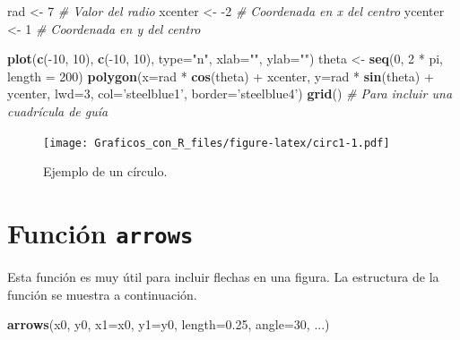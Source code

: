 \documentclass[10pt,]{krantz}
\makeatletter
\newenvironment{Shaded}{\begin{snugshade}}{\end{snugshade}}
\newcommand{\KeywordTok}[1]{\textcolor[rgb]{0.13,0.29,0.53}{\textbf{{#1}}}}
\newcommand{\DataTypeTok}[1]{\textcolor[rgb]{0.13,0.29,0.53}{{#1}}}
\newcommand{\DecValTok}[1]{\textcolor[rgb]{0.00,0.00,0.81}{{#1}}}
\newcommand{\FloatTok}[1]{\textcolor[rgb]{0.00,0.00,0.81}{{#1}}}
\newcommand{\StringTok}[1]{\textcolor[rgb]{0.31,0.60,0.02}{{#1}}}
\newcommand{\CommentTok}[1]{\textcolor[rgb]{0.56,0.35,0.01}{\textit{{#1}}}}
\newcommand{\NormalTok}[1]{{#1}}
\newenvironment{kframe}{%
\medskip{}
\setlength{\fboxsep}{.8em}
 \def\at@end@of@kframe{}%
 \ifinner\ifhmode%
  \def\at@end@of@kframe{\end{minipage}}%
  \begin{minipage}{\columnwidth}%
 \fi\fi%
 \def\FrameCommand##1{\hskip\@totalleftmargin \hskip-\fboxsep
 \colorbox{shadecolor}{##1}\hskip-\fboxsep
     \hskip-\linewidth \hskip-\@totalleftmargin \hskip\columnwidth}%
 \MakeFramed {\advance\hsize-\width
   \@totalleftmargin\z@ \linewidth\hsize
   \@setminipage}}%
 {\par\unskip\endMakeFramed%
 \at@end@of@kframe}
\renewenvironment{Shaded}{\begin{kframe}}{\end{kframe}}
\makeatother
\begin{document}
\begin{Shaded}
\begin{Highlighting}[]
\NormalTok{rad     <-}\StringTok{ }\DecValTok{7}   \CommentTok{# Valor del radio}
\NormalTok{xcenter <-}\StringTok{ }\NormalTok{-}\DecValTok{2}  \CommentTok{# Coordenada en x del centro}
\NormalTok{ycenter <-}\StringTok{ }\DecValTok{1}   \CommentTok{# Coordenada en y del centro}

\KeywordTok{plot}\NormalTok{(}\KeywordTok{c}\NormalTok{(-}\DecValTok{10}\NormalTok{, }\DecValTok{10}\NormalTok{), }\KeywordTok{c}\NormalTok{(-}\DecValTok{10}\NormalTok{, }\DecValTok{10}\NormalTok{), }\DataTypeTok{type=}\StringTok{"n"}\NormalTok{, }\DataTypeTok{xlab=}\StringTok{""}\NormalTok{, }\DataTypeTok{ylab=}\StringTok{""}\NormalTok{)}
\NormalTok{theta <-}\StringTok{ }\KeywordTok{seq}\NormalTok{(}\DecValTok{0}\NormalTok{, }\DecValTok{2} \NormalTok{*}\StringTok{ }\NormalTok{pi, }\DataTypeTok{length =} \DecValTok{200}\NormalTok{)}
\KeywordTok{polygon}\NormalTok{(}\DataTypeTok{x=}\NormalTok{rad *}\StringTok{ }\KeywordTok{cos}\NormalTok{(theta) +}\StringTok{ }\NormalTok{xcenter, }\DataTypeTok{y=}\NormalTok{rad *}\StringTok{ }\KeywordTok{sin}\NormalTok{(theta) +}\StringTok{ }\NormalTok{ycenter,}
      \DataTypeTok{lwd=}\DecValTok{3}\NormalTok{, }\DataTypeTok{col=}\StringTok{'steelblue1'}\NormalTok{, }\DataTypeTok{border=}\StringTok{'steelblue4'}\NormalTok{)}
\KeywordTok{grid}\NormalTok{()  }\CommentTok{# Para incluir una cuadrícula de guía}
\end{Highlighting}
\end{Shaded}

\begin{figure}[htbp]
\centering
\texttt{[image: Graficos\_con\_R\_files/figure-latex/circ1-1.pdf]}
\caption{\label{fig:circ1}Ejemplo de un círculo.}
\end{figure}

\section{\texorpdfstring{Función \texttt{arrows} 
}{Función arrows  }}\label{funcion-arrows}

Esta función es muy útil para incluir flechas en una figura. La
estructura de la función se muestra a continuación.

\begin{Shaded}
\begin{Highlighting}[]
\KeywordTok{arrows}\NormalTok{(x0, y0, }\DataTypeTok{x1=}\NormalTok{x0, }\DataTypeTok{y1=}\NormalTok{y0, }\DataTypeTok{length=}\FloatTok{0.25}\NormalTok{, }\DataTypeTok{angle=}\DecValTok{30}\NormalTok{, ...)}
\end{Highlighting}
\end{Shaded}
\end{document}
